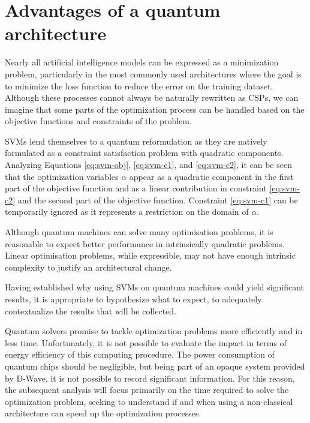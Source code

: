 \section{Advantages of a quantum architecture}

Nearly all artificial intelligence models can be expressed as a minimization problem, particularly in the most commonly used architectures where the goal is to minimize the loss function to reduce the error on the training dataset. Although these processes cannot always be naturally rewritten as CSPs, we can imagine that some parts of the optimization process can be handled based on the objective functions and constraints of the problem.

SVMs lend themselves to a quantum reformulation as they are natively formulated as a constraint satisfaction problem with quadratic components\cite{QSVM}. Analyzing Equations \eqref{eq:svm-obj}, \eqref{eq:svm-c1}, and \eqref{eq:svm-c2}, it can be seen that the optimization variables $\alpha$ appear as a quadratic component in the first part of the objective function and as a linear contribution in constraint \eqref{eq:svm-c2} and the second part of the objective function. Constraint \eqref{eq:svm-c1} can be temporarily ignored as it represents a restriction on the domain of $\alpha$.

Although quantum machines can solve many optimisation problems, it is reasonable to expect better performance in intrinsically quadratic problems. Linear optimisation problems, while expressible, may not have enough intrinsic complexity to justify an architectural change.

Having established why using SVMs on quantum machines could yield significant results, it is appropriate to hypothesize what to expect, to adequately contextualize the results that will be collected.

Quantum solvers promise to tackle optimization problems more efficiently and in less time. Unfortunately, it is not possible to evaluate the impact in terms of energy efficiency of this computing procedure. The power consumption of quantum chips should be negligible\cite{QPUefficiency}, but being part of an opaque system provided by D-Wave, it is not possible to record significant information. For this reason, the subsequent analysis will focus primarily on the time required to solve the optimization problem, seeking to understand if and when using a non-classical architecture can speed up the optimization processes.
